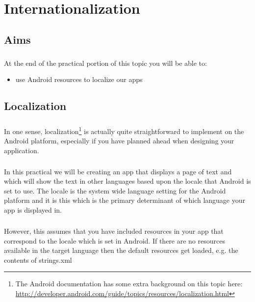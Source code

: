\chapter{Internationalization}

\section{Aims}
\paragraph{} At the end of the practical portion of this topic you will be able to:

\begin{itemize}
\item use Android resources to localize our apps 
\end{itemize}

\section{Localization}
\paragraph{} In one sense, localization\footnote{The Android documentation has some extra background on this topic here: \url{http://developer.android.com/guide/topics/resources/localization.html}} is actually quite straightforward to implement on the Android platform, especially if you have planned ahead when designing your application.

\paragraph{} In this practical we will be creating an app that displays a page of text and which will show the text in other languages based upon the locale that Android is set to use. The locale is the system wide language setting for the Android platform and it is this which is the primary determinant of which language your app is displayed in.

\paragraph{} However, this assumes that you have included resources in your app that correspond to the locale which is set in Android. If there are no resources available in the target language then the default resources get loaded, e.g. the contents of strings.xml

